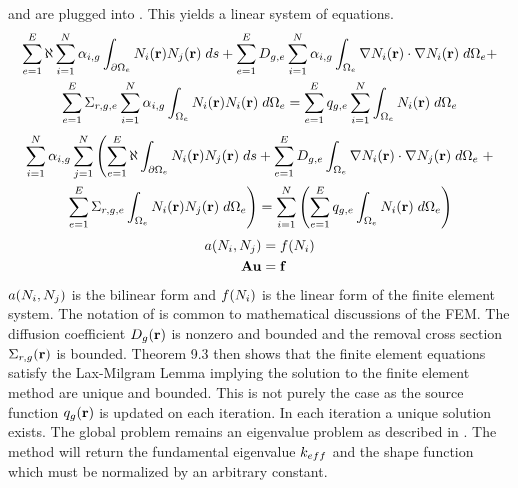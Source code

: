      and  are plugged
    into . This yields a linear system of equations.
    \begin{multline}
      \sum_{e=1}^{E} \aleph \sum_{i=1}^{N} \alpha_{i,g}
        \int_{\partial \Omega_e}
        N_i(\mathbf{r})  N_j(\mathbf{r}) \;ds +
        \sum_{e=1}^{E} D_{g,e} \sum_{i=1}^{N} \alpha_{i,g}
        \int_{\Omega_e} \mathbf{\nabla} N_i(\mathbf{r}) \cdot \mathbf{\nabla} N_i(\mathbf{r})\;d\Omega_e
        + \\
        \sum_{e=1}^{E} \Sigma_{r,g,e} \sum_{i=1}^{N} \alpha_{i,g}
        \int_{\Omega_e} N_i(\mathbf{r}) N_i(\mathbf{r}) \; d\Omega_e =
        \sum_{e=1}^{E} q_{g,e} \sum_{i=1}^{N} 
        \int_{\Omega_e} N_i(\mathbf{r}) \; d\Omega_e
    \end{multline}
    \begin{multline}
      \sum_{i=1}^{N} \alpha_{i,g} \sum_{j=1}^{N} \left(
        \sum_{e=1}^{E} \aleph \int_{\partial \Omega_e}
        N_i(\mathbf{r})  N_j(\mathbf{r}) \;ds +
        \sum_{e=1}^{E} D_{g,e} 
        \int_{\Omega_e} \mathbf{\nabla} N_i(\mathbf{r}) \cdot \mathbf{\nabla} N_j(\mathbf{r})\;d\Omega_e
        \right.
        + \\
        \left.
        \sum_{e=1}^{E} \Sigma_{r,g,e}
        \int_{\Omega_e} N_i(\mathbf{r}) N_j(\mathbf{r}) \; d\Omega_e \right) =
        \sum_{i=1}^{N} \left(
        \sum_{e=1}^{E} q_{g,e} 
        \int_{\Omega_e} N_i(\mathbf{r}) \; d\Omega_e \right)
    \end{multline}
    \begin{align}
      \label{eq:fem_notation}
      a(N_i,N_j) &= f(N_i) \\
      \mathbf{A} \mathbf{u} &= \mathbf{f}
    \end{align}
    $a(N_i,N_j)$ is the bilinear form and $f(N_i)$ is the linear 
    form of the finite element system. The notation of  is
    common to mathematical discussions of the FEM. The diffusion coefficient 
    $D_g(\mathbf{r})$ is nonzero and bounded and the removal cross section 
    $\Sigma_{r,g}(\mathbf{r})$ is bounded. Theorem 9.3 \cite{textbookli} then shows 
    that the finite element equations satisfy the Lax-Milgram Lemma implying 
    the solution to the finite element method are unique and bounded. This is 
    not purely the case as the source function $q_g(\mathbf{r})$ is updated on each 
    iteration. In each iteration a unique solution exists. The global problem
    remains an eigenvalue problem as described in \cite{duderstathamilton}. The
    method will return the fundamental eigenvalue $k_{eff}$ and the shape function
    which must be normalized by an arbitrary constant.
    

